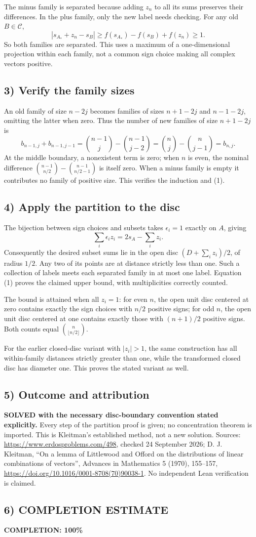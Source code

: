 The minus family is separated because adding $z_n$ to all its sums preserves their differences. In the plus family, only the new label needs checking. For any old $B\in\mathcal C$,
\[
|s_{A_*}+z_n-s_B|\ge f(s_{A_*})-f(s_B)+f(z_n)\ge1.
\]
So both families are separated. This uses a maximum of a one-dimensional projection within each family, not a common sign choice making all complex vectors positive.

\subsection*{3) Verify the family sizes}
An old family of size $n-2j$ becomes families of sizes $n+1-2j$ and $n-1-2j$, omitting the latter when zero. Thus the number of new families of size $n+1-2j$ is
\[
b_{n-1,j}+b_{n-1,j-1}
=\binom{n-1}j-\binom{n-1}{j-2}
=\binom nj-\binom n{j-1}=b_{n,j}.
\]
At the middle boundary, a nonexistent term is zero; when $n$ is even, the nominal difference $\binom{n-1}{n/2}-\binom{n-1}{n/2-1}$ is itself zero. When a minus family is empty it contributes no family of positive size. This verifies the induction and (1).

\subsection*{4) Apply the partition to the disc}
The bijection between sign choices and subsets takes $\epsilon_i=1$ exactly on $A$, giving
\[\sum_i\epsilon_i z_i=2s_A-\sum_i z_i.
\]
Consequently the desired subset sums lie in the open disc $(D+\sum_i z_i)/2$, of radius $1/2$. Any two of its points are at distance strictly less than one. Such a collection of labels meets each separated family in at most one label. Equation (1) proves the claimed upper bound, with multiplicities correctly counted.

The bound is attained when all $z_i=1$: for even $n$, the open unit disc centered at zero contains exactly the sign choices with $n/2$ positive signs; for odd $n$, the open unit disc centered at one contains exactly those with $(n+1)/2$ positive signs. Both counts equal $\binom n{\lfloor n/2\rfloor}$.

For the earlier closed-disc variant with $|z_i|>1$, the same construction has all within-family distances strictly greater than one, while the transformed closed disc has diameter one. This proves the stated variant as well.

\subsection*{5) Outcome and attribution}
\textbf{SOLVED with the necessary disc-boundary convention stated explicitly.} Every step of the partition proof is given; no concentration theorem is imported. This is Kleitman's established method, not a new solution. Sources: \url{https://www.erdosproblems.com/498}, checked 24 September 2026; D. J. Kleitman, ``On a lemma of Littlewood and Offord on the distributions of linear combinations of vectors'', Advances in Mathematics 5 (1970), 155--157, \url{https://doi.org/10.1016/0001-8708(70)90038-1}. No independent Lean verification is claimed.

\subsection*{6) COMPLETION ESTIMATE}
\textbf{COMPLETION: 100\%}
